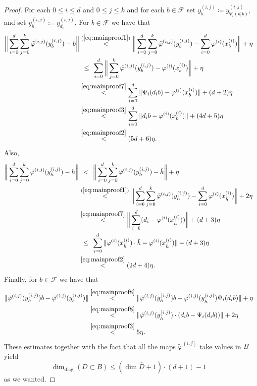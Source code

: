 \documentclass[11pt,a4paper]{amsart}
\theoremstyle{definition}
\numberwithin{equation}{section}
\newcommand{\mc}[1]{\mathcal{#1}}
\begin{document}
\begin{proof}
For each $0\le i\le d$ and $0\le j\le k$ and for each $b\in\mc{F}$ set $y_b^{(i,j)}\coloneqq y_{\Psi_i(d_ib)}^{(i,j)}$, and  set $y_h^{(i,j)} \coloneqq y_{d_i}^{(i,j)}$. For $b\in\mc{F}$ we have that
\begin{align*}
\bigg\|\sum_{i=0}^d\sum_{j=0}^k\tilde{\varphi}^{(i,j)}(y_b^{(i,j)}) - b\bigg\| &\overset{(\ref{eq:mainproof1})}{<} \bigg\|\sum_{i=0}^d\sum_{j=0}^k\tilde{\varphi}^{(i,j)}(y_b^{(i,j)}) - \sum_{i=0}^d\varphi^{(i)}(x_b^{(i)})\bigg\|+\eta\\
&\overset{\;\;\;\;\;\;\;}{\le} \sum_{i=0}^d\bigg\|\sum_{j=0}^k\tilde{\varphi}^{(i,j)}(y_b^{(i,j)}) - \varphi^{(i)}(x_b^{(i)})\bigg\| +\eta\\
&\overset{\eqref{eq:mainproof7}}{<} \sum_{i=0}^d\|\Psi_i(d_ib) - \varphi^{(i)}(x_b^{(i)})\| + (d+2)\eta\\
&\overset{\eqref{eq:mainproof3}}{<} \sum_{i=0}^d\|d_ib-\varphi^{(i)}(x_b^{(i)})\|+(4d+5)\eta\\
&\overset{\eqref{eq:mainproof2}}{<}(5d+6)\eta.
\end{align*}
Also,
\begin{align*}
\bigg\|\sum_{i=0}^d\sum_{j=0}^k\tilde{\varphi}^{(i,j)}(y_h^{(i,j)})-h\bigg\|&\overset{\;\;\;\;\;\;\;}{<} \bigg\|\sum_{i=0}^d\sum_{j=0}^k\tilde{\varphi}^{(i,j)}(y_{h}^{(i,j)}) - \hat{h} \bigg\|+ \eta\\
&\overset{(\ref{eq:mainproof1})}{<}  \bigg\|\sum_{i=0}^d\sum_{j=0}^k\tilde{\varphi}^{(i,j)}(y_{h}^{(i,j)}) - \sum_{i=0}^d \varphi^{(i)}(x_{\hat{h}}^{(i)})\bigg\| +2\eta \\
&\overset{\eqref{eq:mainproof7}}{<}\bigg\|\sum_{i=0}^d(d_i-\varphi^{(i)}(x_{\hat{h}}^{(i)}))\bigg\|+(d+3)\eta\\
&\overset{\;\;\;\;\;\;\;}{\le}\sum_{i=0}^d\|\varphi^{(i)}(x_{\bar{h}}^{(i)})\cdot \hat{h} - \varphi^{(i)}(x_{\hat{h}}^{(i)})\| +(d+3)\eta\\
&\overset{\eqref{eq:mainproof2}}{<}  (2d+4)\eta.
\end{align*}
Finally, for $b\in\mc{F}$ we have that
\begin{align*}
\|\tilde{\varphi}^{(i,j)}(y_h^{(i,j)}) b - \tilde{\varphi}^{(i,j)}(y_b^{(i,j)})\| &\overset{\eqref{eq:mainproof8}}{<}  \|\tilde{\varphi}^{(i,j)}(y_h^{(i,j)}) b  - \tilde{\varphi}^{(i,j)}(y_{\bar{h}}^{(i,j)}) \Psi_i(d_ib)\| +\eta \\
&\overset{\eqref{eq:mainproof8}}{<} \|\tilde{\varphi}^{(i,j)}(y_{\bar{h}}^{(i,j)})\cdot (d_ib-\Psi_i(d_ib))\| + 2\eta\\
&\overset{\eqref{eq:mainproof3}}{<} 5\eta.
\end{align*}
These estimates together with the fact that all the maps $\tilde{\varphi}^{(i,j)}$ take values in $B$ yield
\begin{equation*}
\dim_\mathrm{diag}(D\subset B)\le (\dim\widehat{D}+1) \cdot (d+1)-1
\end{equation*}
as we wanted.
\end{proof}
\end{document}
